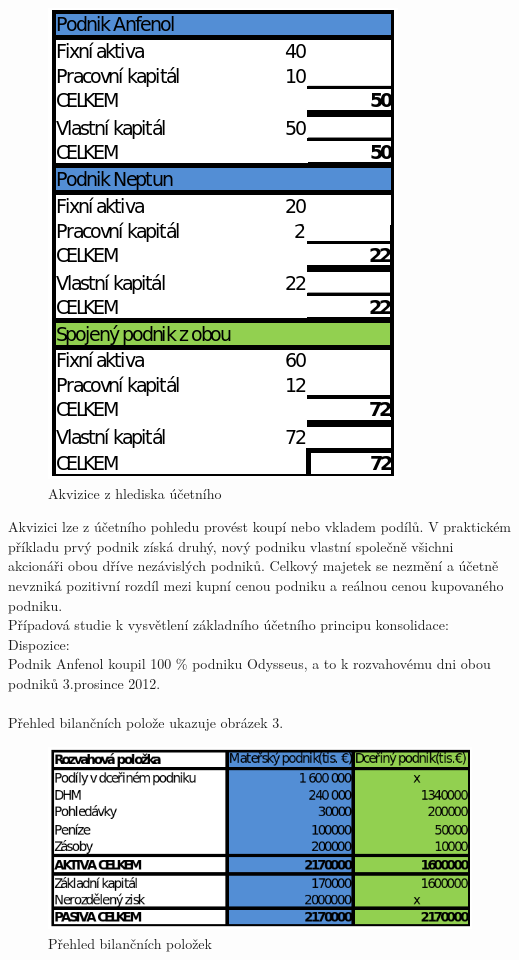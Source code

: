 \documentclass[12pt]{article}
\begin{document}
\begin{figure}[h]
\begin{center}
	\caption{Akvizice z hlediska účetního}
		\label{figure:ucetni-vyznam}
		\includegraphics[scale=0.6]{pics/2-tabulka.png}
	\end{center}
\end{figure}

Akvizici lze z účetního pohledu provést koupí nebo vkladem podílů. V praktickém příkladu prvý podnik získá druhý, nový podniku vlastní společně všichni akcionáři obou dříve nezávislých podniků. Celkový majetek se nezmění a účetně nevzniká pozitivní rozdíl mezi kupní cenou podniku a reálnou cenou kupovaného podniku.\\

Případová studie k vysvětlení základního účetního principu konsolidace:\\
Dispozice:\\
Podnik Anfenol koupil 100  \% podniku Odysseus, a to k rozvahovému dni obou podniků 3.prosince 2012.
\\
\\
Přehled bilančních polože ukazuje obrázek 3.
\begin{figure}[!h]
\begin{center}
	\caption{Přehled bilančních položek}
		\label{figure:prehled-bilancnich-polozek}
		\includegraphics[scale=0.58]{pics/3-tabulka.png}
	\end{center}
\end{figure}
\\
\end{document}
